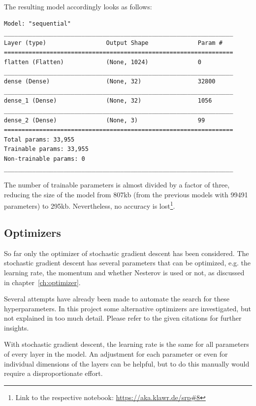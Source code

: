 The resulting model accordingly looks as follows:

\begin{lstlisting}
Model: "sequential"
_________________________________________________________________
Layer (type)                 Output Shape              Param #   
=================================================================
flatten (Flatten)            (None, 1024)              0         
_________________________________________________________________
dense (Dense)                (None, 32)                32800     
_________________________________________________________________
dense_1 (Dense)              (None, 32)                1056      
_________________________________________________________________
dense_2 (Dense)              (None, 3)                 99        
=================================================================
Total params: 33,955
Trainable params: 33,955
Non-trainable params: 0
_________________________________________________________________
\end{lstlisting}

The number of trainable parameters is almost divided by a factor of three, reducing the size of the model from 807kb (from the previous models with 99491 parameters) to 295kb.
Nevertheless, no accuracy is lost\footnote{Link to the respective notebook: \url{https://aka.klawr.de/srp\#8}}.

\subsection{Optimizers}

So far only the optimizer of stochastic gradient descent has been considered.
The stochastic gradient descent has several parameters that can be optimized, e.g. the learning rate, the momentum and whether Nesterov is used or not, as discussed in chapter~\ref{ch:optimizer}.

Several attempts have already been made to automate the search for these hyperparameters.
In this project some alternative optimizers are investigated, but not explained in too much detail.
Please refer to the given citations for further insights.

With stochastic gradient descent, the learning rate is the same for all parameters of every layer in the model.
An adjustment for each parameter or even for individual dimensions of the layers can be helpful, but to do this manually would require a disproportionate effort.

